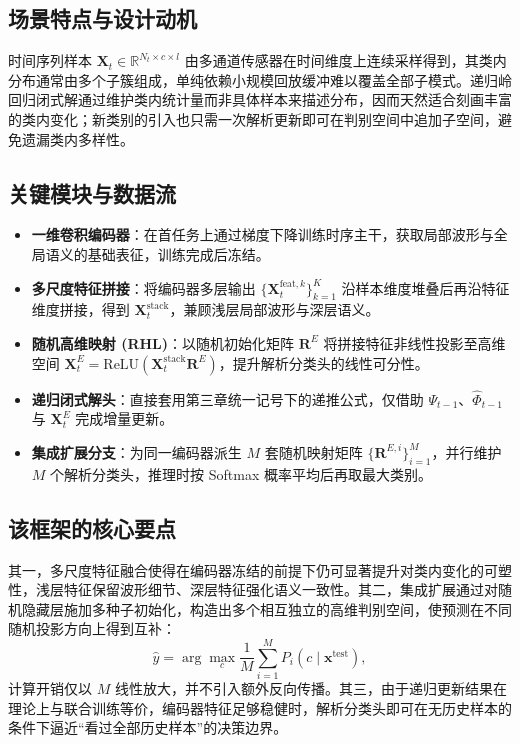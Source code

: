 \subsection{场景特点与设计动机}

时间序列样本 $\mathbf{X}_t \in \mathbb{R}^{N_t \times c \times l}$ 由多通道传感器在时间维度上连续采样得到，其类内分布通常由多个子簇组成，单纯依赖小规模回放缓冲难以覆盖全部子模式。递归岭回归闭式解通过维护类内统计量而非具体样本来描述分布，因而天然适合刻画丰富的类内变化；新类别的引入也只需一次解析更新即可在判别空间中追加子空间，避免遗漏类内多样性。

\subsection{关键模块与数据流}

\begin{itemize}
    \item \textbf{一维卷积编码器}：在首任务上通过梯度下降训练时序主干，获取局部波形与全局语义的基础表征，训练完成后冻结。
    \item \textbf{多尺度特征拼接}：将编码器多层输出 $\{\mathbf{X}_t^{\mathrm{feat},k}\}_{k=1}^{K}$ 沿样本维度堆叠后再沿特征维度拼接，得到 $\mathbf{X}_t^{\mathrm{stack}}$，兼顾浅层局部波形与深层语义。
    \item \textbf{随机高维映射 (RHL)}：以随机初始化矩阵 $\mathbf{R}^E$ 将拼接特征非线性投影至高维空间 $\mathbf{X}_t^{E}=\mathrm{ReLU}(\mathbf{X}_t^{\mathrm{stack}}\mathbf{R}^E)$，提升解析分类头的线性可分性。
    \item \textbf{递归闭式解头}：直接套用第三章统一记号下的递推公式，仅借助 $\Psi_{t-1}$、$\widehat{\Phi}_{t-1}$ 与 $\mathbf{X}_t^{E}$ 完成增量更新。
    \item \textbf{集成扩展分支}：为同一编码器派生 $M$ 套随机映射矩阵 $\{\mathbf{R}^{E,i}\}_{i=1}^{M}$，并行维护 $M$ 个解析分类头，推理时按 Softmax 概率平均后再取最大类别。
\end{itemize}

\subsection{该框架的核心要点}

其一，多尺度特征融合使得在编码器冻结的前提下仍可显著提升对类内变化的可塑性，浅层特征保留波形细节、深层特征强化语义一致性。其二，集成扩展通过对随机隐藏层施加多种子初始化，构造出多个相互独立的高维判别空间，使预测在不同随机投影方向上得到互补：
\begin{equation}
\hat{y}=\arg\max_{c}\frac{1}{M}\sum_{i=1}^{M}P_i(c\mid \mathbf{x}^{\mathrm{test}}),
\end{equation}
计算开销仅以 $M$ 线性放大，并不引入额外反向传播。其三，由于递归更新结果在理论上与联合训练等价，编码器特征足够稳健时，解析分类头即可在无历史样本的条件下逼近“看过全部历史样本”的决策边界。

